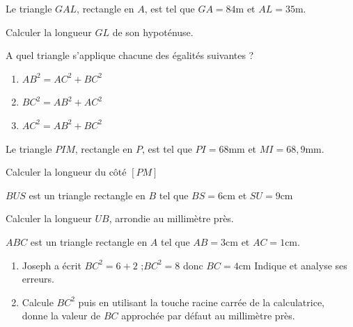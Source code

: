\documentclass[a4paper,10pt]{report}
\begin{document}
\begin{ex}
Le triangle $GAL$, rectangle en $A$, est tel que $GA=84$m et $AL= 35$m.

\medskip
\noindent Calculer la longueur $GL$ de son hypoténuse.
\end{ex}

\begin{ex}
A quel triangle s'applique chacune des égalités suivantes ?
\begin{enumerate}[font=\color{exer1}]
\item $AB^2=AC^2+BC^2$              
\item $BC^2=AB^2+AC^2$                
\item $AC^2=AB^2+BC^2$
\end{enumerate}
\end{ex}

\begin{ex}
Le triangle $PIM$, rectangle en $P$, est tel que $PI=68$mm et $MI=68,9$mm.

\medskip
\noindent Calculer la longueur du côté $[PM]$
\end{ex}

\begin{ex}
$BUS$ est un triangle rectangle en $B$ tel que $BS= 6$cm et $SU=9$cm

\medskip
\noindent Calculer la longueur $UB$, arrondie au millimètre près.
\end{ex}

\begin{ex}
$ABC$ est un triangle rectangle en $A$ tel que $AB= 3$cm et $AC= 1$cm.
\begin{enumerate}[font=\color{exer1}]
\item Joseph a écrit \og $BC^2=6+2$ ;$ BC^2=8$ donc $BC=4$cm \fg{}
Indique et analyse ses erreurs.
\item Calcule $BC^2$ puis en utilisant la touche racine carrée de la calculatrice,\\ donne la valeur de $BC$ approchée par défaut au millimètre près.
\end{enumerate}
\end{ex}
\end{document}

